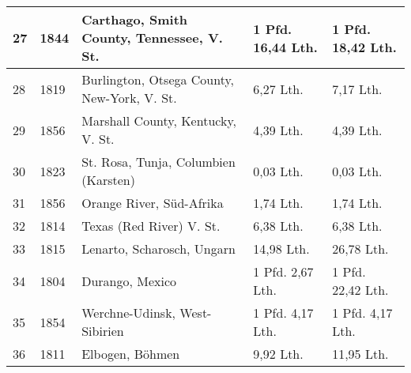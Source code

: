 \documentclass[a4paper, 11pt, oneside]{article}
\begin{document}
\begin{center}
\begin{footnotesize}
\begin{tabular}{ |p{7mm}|p{9mm}|p{45mm}|p{24mm}|p{24mm}| }
    27 & 1844 & Carthago, Smith County, Tennessee, V. St. & 1 Pfd. 16,44 Lth. & 1 Pfd. 18,42 Lth.\\\hline
    28 & 1819 & Burlington, Otsega County, New-York, V. St. & 6,27 Lth. & 7,17 Lth.\\\hline
    29 & 1856 & Marshall County, Kentucky, V. St. & 4,39 Lth. & 4,39 Lth.\\\hline
    30 & 1823 & St. Rosa, Tunja, Columbien (Karsten) & 0,03 Lth. & 0,03 Lth.\\\hline
    31 & 1856 & Orange River, Süd-Afrika & 1,74 Lth. & 1,74 Lth.\\\hline
    32 & 1814 & Texas (Red River) V. St. & 6,38 Lth. & 6,38 Lth.\\\hline
    33 & 1815 & Lenarto, Scharosch, Ungarn & 14,98 Lth. & 26,78 Lth.\\\hline
    34 & 1804 & Durango, Mexico & 1 Pfd. 2,67 Lth. & 1 Pfd. 22,42 Lth.\\\hline
    35 & 1854 & Werchne-Udinsk, West-Sibirien & 1 Pfd. 4,17 Lth. & 1 Pfd. 4,17 Lth.\\\hline
    36 & 1811 & Elbogen, Böhmen & 9,92 Lth. & 11,95 Lth.\\
    \hline
\end{tabular}
\end{footnotesize}
\end{center}
\end{document}
